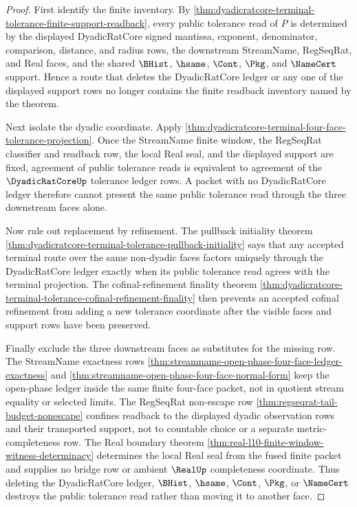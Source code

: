 \begin{proof}
First identify the finite inventory. By \autoref{thm:dyadicratcore-terminal-tolerance-finite-support-readback}, every public tolerance read of $P$ is determined by the displayed DyadicRatCore signed mantissa, exponent, denominator, comparison, distance, and radius rows, the downstream StreamName, RegSeqRat, and Real faces, and the shared $\BHist$, $\hsame$, $\Cont$, $\Pkg$, and $\NameCert$ support. Hence a route that deletes the DyadicRatCore ledger or any one of the displayed support rows no longer contains the finite readback inventory named by the theorem.

Next isolate the dyadic coordinate. Apply \autoref{thm:dyadicratcore-terminal-four-face-tolerance-projection}. Once the StreamName finite window, the RegSeqRat classifier and readback row, the local Real seal, and the displayed support are fixed, agreement of public tolerance reads is equivalent to agreement of the $\DyadicRatCoreUp$ tolerance ledger rows. A packet with no DyadicRatCore ledger therefore cannot present the same public tolerance read through the three downstream faces alone.

Now rule out replacement by refinement. The pullback initiality theorem \autoref{thm:dyadicratcore-terminal-tolerance-pullback-initiality} says that any accepted terminal route over the same non-dyadic faces factors uniquely through the DyadicRatCore ledger exactly when its public tolerance read agrees with the terminal projection. The cofinal-refinement finality theorem \autoref{thm:dyadicratcore-terminal-tolerance-cofinal-refinement-finality} then prevents an accepted cofinal refinement from adding a new tolerance coordinate after the visible faces and support rows have been preserved.

Finally exclude the three downstream faces as substitutes for the missing row. The StreamName exactness rows \autoref{thm:streamname-open-phase-four-face-ledger-exactness} and \autoref{thm:streamname-open-phase-four-face-normal-form} keep the open-phase ledger inside the same finite four-face packet, not in quotient stream equality or selected limits. The RegSeqRat non-escape row \autoref{thm:regseqrat-tail-budget-nonescape} confines readback to the displayed dyadic observation rows and their transported support, not to countable choice or a separate metric-completeness row. The Real boundary theorem \autoref{thm:real-l10-finite-window-witness-determinacy} determines the local Real seal from the fused finite packet and supplies no bridge row or ambient $\RealUp$ completeness coordinate. Thus deleting the DyadicRatCore ledger, $\BHist$, $\hsame$, $\Cont$, $\Pkg$, or $\NameCert$ destroys the public tolerance read rather than moving it to another face.
\end{proof}

